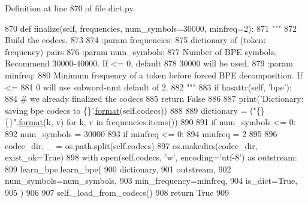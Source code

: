 Definition at line 870 of file dict.\+py.


\begin{DoxyCode}
870     \textcolor{keyword}{def }finalize(self, frequencies, num\_symbols=30000, minfreq=2):
871         \textcolor{stringliteral}{"""}
872 \textcolor{stringliteral}{        Build the codecs.}
873 \textcolor{stringliteral}{}
874 \textcolor{stringliteral}{        :param frequencies:}
875 \textcolor{stringliteral}{            dictionary of (token: frequency) pairs}
876 \textcolor{stringliteral}{        :param num\_symbols:}
877 \textcolor{stringliteral}{            Number of BPE symbols. Recommend 30000-40000.  If <= 0, default}
878 \textcolor{stringliteral}{            30000 will be used.}
879 \textcolor{stringliteral}{        :param minfreq:}
880 \textcolor{stringliteral}{            Minimum frequency of a token before forced BPE decomposition. If <=}
881 \textcolor{stringliteral}{            0 will use subword-nmt default of 2.}
882 \textcolor{stringliteral}{        """}
883         \textcolor{keywordflow}{if} hasattr(self, \textcolor{stringliteral}{'bpe'}):
884             \textcolor{comment}{# we already finalized the codecs}
885             \textcolor{keywordflow}{return} \textcolor{keyword}{False}
886 
887         print(\textcolor{stringliteral}{'Dictionary: saving bpe codecs to \{\}'}.\hyperlink{namespaceparlai_1_1chat__service_1_1services_1_1messenger_1_1shared__utils_a32e2e2022b824fbaf80c747160b52a76}{format}(self.codecs))
888 
889         dictionary = (\textcolor{stringliteral}{"\{\} \{\}"}.\hyperlink{namespaceparlai_1_1chat__service_1_1services_1_1messenger_1_1shared__utils_a32e2e2022b824fbaf80c747160b52a76}{format}(k, v) \textcolor{keywordflow}{for} k, v \textcolor{keywordflow}{in} frequencies.items())
890 
891         \textcolor{keywordflow}{if} num\_symbols <= 0:
892             num\_symbols = 30000
893         \textcolor{keywordflow}{if} minfreq <= 0:
894             minfreq = 2
895 
896         codec\_dir, \_ = os.path.split(self.codecs)
897         os.makedirs(codec\_dir, exist\_ok=\textcolor{keyword}{True})
898         with open(self.codecs, \textcolor{stringliteral}{'w'}, encoding=\textcolor{stringliteral}{'utf-8'}) \textcolor{keyword}{as} outstream:
899             learn\_bpe.learn\_bpe(
900                 dictionary,
901                 outstream,
902                 num\_symbols=num\_symbols,
903                 min\_frequency=minfreq,
904                 is\_dict=\textcolor{keyword}{True},
905             )
906 
907         self.\_load\_from\_codecs()
908         \textcolor{keywordflow}{return} \textcolor{keyword}{True}
909 
\end{DoxyCode}
\mbox{\label{classparlai_1_1core_1_1dict_1_1__BPEHelper_a1492c4bca01a00536eef0e3cc15f134b}} 
